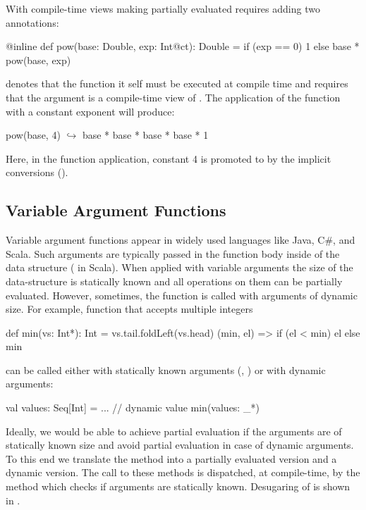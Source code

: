 With compile-time views making partially evaluated requires adding two annotations:

\begin{lstparagraph}
@inline def pow(base: Double, exp: Int@ct): Double =
  if (exp == 0) 1 else base * pow(base, exp)
\end{lstparagraph}

 denotes that the  function it self must be executed at
 compile time and  requires that the  argument is a compile-time
 view of . The application of the function  with a constant
 exponent will produce:

\begin{lstparagraph}
pow(base, 4)
  $\hookrightarrow$ base * base * base * base * 1
\end{lstparagraph}

Here, in the function application, constant 4 is promoted to  by the implicit
conversions ().

\subsection{Variable Argument Functions}
\label{sct:varargs}

Variable argument functions appear in widely used languages like Java, C\#, and Scala.
 Such arguments are typically passed in the function body inside of the data structure
 (\eg {} in Scala). When applied with variable arguments the size of the
 data-structure is statically known and all operations on them can be partially
 evaluated. However, sometimes, the function is called with arguments of dynamic size.
 For example, function  that accepts multiple integers\begin{lstparagraph}
def min(vs: Int*): Int = vs.tail.foldLeft(vs.head) {
  (min, el) => if (el < min) el else min
}
\end{lstparagraph}can be called either with statically known arguments
 (\eg, ) or with dynamic arguments:\begin{lstparagraph}
val values: Seq[Int] = ... // dynamic value
min(values: _*)
\end{lstparagraph}

Ideally, we would be able to achieve partial evaluation if the arguments are of statically
known size and avoid partial evaluation in case of dynamic arguments. To this end we translate
the method  into a partially evaluated version and a dynamic version. The call to these
methods is dispatched, at compile-time, by the  method which checks if
arguments are statically known. Desugaring of  is shown in .

